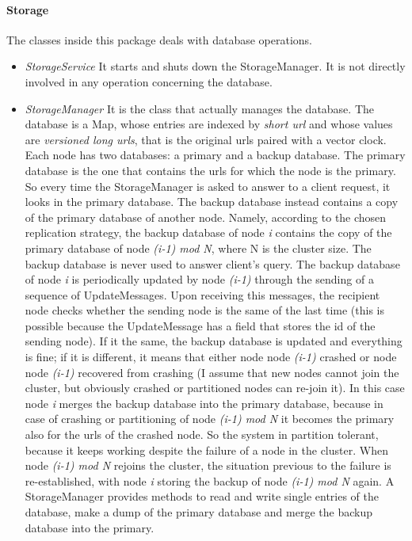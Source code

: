 \documentclass{article}
\begin{document}
\paragraph{Storage} The classes inside this package deals with database operations.
\begin{itemize}
\item \textit{StorageService} It starts and shuts down the StorageManager. It is not directly involved in any operation concerning the database.
\item \textit{StorageManager} It is the class that actually manages the database. The database is a Map, whose entries are indexed by \textit{short url} and whose values are \textit{versioned long urls}, that is the original urls paired with a vector clock. Each node has two databases: a primary and a backup database. The primary database is the one that contains the urls for which the node is the primary. So every time the StorageManager is asked to answer to a client request, it looks in the primary database. The backup database instead contains a copy of the primary database of another node. Namely, according to the chosen replication strategy, the backup database of node \textit{i} contains the copy of the primary database of node \textit{(i-1) mod N}, where N is the cluster size. The backup database is never used to answer client's query. The backup database of node \textit{i} is periodically updated by node \textit{(i-1)} through the sending of a sequence of UpdateMessages. Upon receiving this messages, the recipient node checks whether the sending node is the same of the last time (this is possible because the UpdateMessage has a field that stores the id of the sending node). If it the same, the backup database is updated and everything is fine; if it is different, it means that either node  node \textit{(i-1)} crashed or node node \textit{(i-1)} recovered from crashing (I assume that new nodes cannot join the cluster, but obviously crashed or partitioned nodes can re-join it). In this case node \textit{i} merges the backup database into the primary database, because in case of crashing or partitioning of node \textit{(i-1) mod N} it becomes the primary also for the urls of the crashed node. So the system in partition tolerant, because it keeps working despite the failure of a node in the cluster. When node \textit{(i-1) mod N} rejoins the cluster, the situation previous to the failure is re-established, with node \textit{i} storing the backup of node \textit{(i-1) mod N} again. A StorageManager provides methods to read and write single entries of the database, make a dump of the primary database and merge the backup database into the primary. 
\end{itemize}
\end{document}

